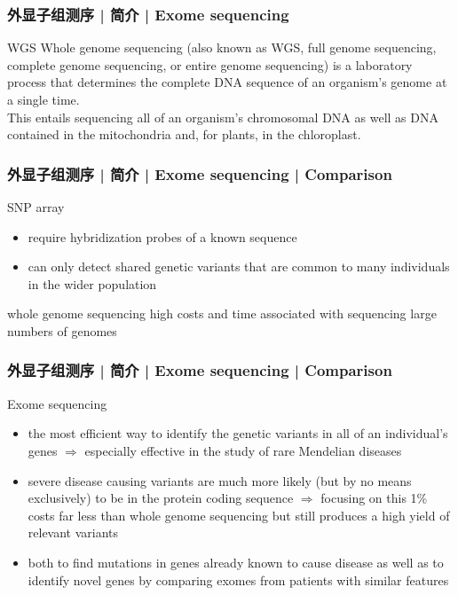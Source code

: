 \begin{frame}
  \frametitle{外显子组测序 | 简介 | Exome sequencing}
  \begin{block}{WGS}
    Whole genome sequencing (also known as WGS, full genome sequencing, complete genome sequencing, or entire genome sequencing) is a laboratory process that determines the complete DNA sequence of an organism's genome at a single time.\\
    \vspace{1em}
    This entails sequencing all of an organism's chromosomal DNA as well as DNA contained in the mitochondria and, for plants, in the chloroplast.
  \end{block}
\end{frame}

\begin{frame}
  \frametitle{外显子组测序 | 简介 | Exome sequencing | Comparison}
  \begin{block}{SNP array}
    \begin{itemize}
      \item require hybridization probes of a known sequence
      \item can only detect shared genetic variants that are common to many individuals in the wider population 
    \end{itemize}
  \end{block}
  \pause
  \begin{block}{whole genome sequencing}
    high costs and time associated with sequencing large numbers of genomes
  \end{block}
\end{frame}

\begin{frame}
  \frametitle{外显子组测序 | 简介 | Exome sequencing | Comparison}
  \begin{block}{Exome sequencing}
    \begin{itemize}
      \item the most efficient way to identify the genetic variants in all of an individual's genes $\Rightarrow$ especially effective in the study of rare Mendelian diseases
      \item severe disease causing variants are much more likely (but by no means exclusively) to be in the protein coding sequence $\Rightarrow$ focusing on this 1\% costs far less than whole genome sequencing but still produces a high yield of relevant variants
      \item both to find mutations in genes already known to cause disease as well as to identify novel genes by comparing exomes from patients with similar features
    \end{itemize}
  \end{block}
\end{frame}

